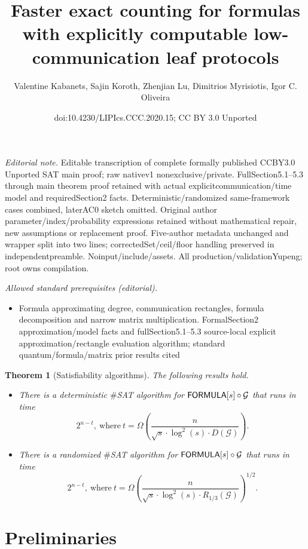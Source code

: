 \documentclass[10pt,a4paper]{article}
\title{Faster exact counting for formulas with explicitly computable low-communication leaf protocols}
\author{Valentine Kabanets, Sajin Koroth, Zhenjian Lu, Dimitrios Myrisiotis, Igor C. Oliveira}
\date{doi:10.4230/LIPIcs.CCC.2020.15; CC BY 3.0 Unported}
\newtheorem{theorem}{Theorem}
\newcommand{\FORMULA}{{\sf FORMULA}}
\begin{document}
\maketitle
\noindent\textit{Editorial note.} Editable transcription of complete formally published CCBY3.0 Unported SAT main proof; raw nativev1 nonexclusive/private. FullSection5.1–5.3 through main theorem proof retained with actual explicitcommunication/time model and requiredSection2 facts. Deterministic/randomized same-framework cases combined, laterAC0 sketch omitted. Original author parameter/index/probability expressions retained without mathematical repair, new assumptions or replacement proof. Five-author metadata unchanged and wrapper split into two lines; correctedSet/ceil/floor handling preserved in independentpreamble. Noinput/include/assets. All production/validationYupeng; root owns compilation.\par\medskip
\noindent\textit{Allowed standard prerequisites (editorial).}\begin{itemize}
\item Formula approximating degree, communication rectangles, formula decomposition and narrow matrix multiplication. FormalSection2 approximation/model facts and fullSection5.1–5.3 source-local explicit approximation/rectangle evaluation algorithm; standard quantum/formula/matrix prior results cited
\end{itemize}\medskip
\setcounter{theorem}{4}
	\begin{theorem}[Satisfiability algorithms]\label{thm:main_sat}
	The following results hold.
    	\begin{itemize}
    	    \item[\emph{1.}] There is a deterministic $\#$\emph{SAT} algorithm for $\FORMULA[s] \circ \mathcal{G}$ that runs in time
    	    $$
    	        2^{n - t},~\text{where}~t = \Omega\! \left ( \frac{n} {\sqrt{s} \cdot \log^2(s) \cdot D(\mathcal{G}) }\right).
    	    $$
    	    
    	    \item[\emph{2.}] There is a randomized $\#$\emph{SAT} algorithm for $\FORMULA[s] \circ \mathcal{G}$ that runs in time
    	    $$
    	        2^{n - t},~\text{where}~t = \Omega\! \left ( \frac{n} {\sqrt{s} \cdot \log^2(s) \cdot R_{1/3}(\mathcal{G}) }  \right )^{\! 1/2}.
    	    $$
    	\end{itemize}
	\end{theorem}

\setcounter{section}{1}
\setcounter{theorem}{7}
	\section{Preliminaries}\label{sec:preliminaries}
	
\end{document}
